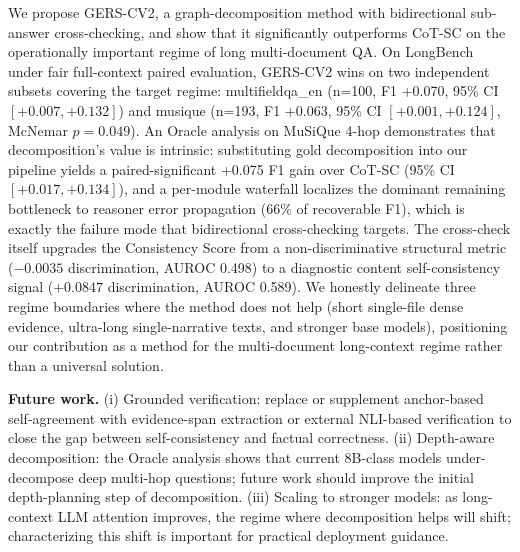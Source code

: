 \documentclass[11pt,a4paper]{article}
\begin{document}
We propose GERS-CV2, a graph-decomposition method with bidirectional sub-answer cross-checking, and show that it significantly outperforms CoT-SC on the operationally important regime of long multi-document QA. On LongBench under fair full-context paired evaluation, GERS-CV2 wins on two independent subsets covering the target regime: multifieldqa\_en (n=100, F1 +0.070, 95\% CI $[+0.007, +0.132]$) and musique (n=193, F1 +0.063, 95\% CI $[+0.001, +0.124]$, McNemar $p=0.049$). An Oracle analysis on MuSiQue 4-hop demonstrates that decomposition's value is intrinsic: substituting gold decomposition into our pipeline yields a paired-significant +0.075 F1 gain over CoT-SC (95\% CI $[+0.017, +0.134]$), and a per-module waterfall localizes the dominant remaining bottleneck to reasoner error propagation (66\% of recoverable F1), which is exactly the failure mode that bidirectional cross-checking targets. The cross-check itself upgrades the Consistency Score from a non-discriminative structural metric ($-0.0035$ discrimination, AUROC 0.498) to a diagnostic content self-consistency signal ($+0.0847$ discrimination, AUROC 0.589). We honestly delineate three regime boundaries where the method does not help (short single-file dense evidence, ultra-long single-narrative texts, and stronger base models), positioning our contribution as a method for the multi-document long-context regime rather than a universal solution.

\textbf{Future work.} (i) Grounded verification: replace or supplement anchor-based self-agreement with evidence-span extraction or external NLI-based verification to close the gap between self-consistency and factual correctness. (ii) Depth-aware decomposition: the Oracle analysis shows that current 8B-class models under-decompose deep multi-hop questions; future work should improve the initial depth-planning step of decomposition. (iii) Scaling to stronger models: as long-context LLM attention improves, the regime where decomposition helps will shift; characterizing this shift is important for practical deployment guidance.
\end{document}
